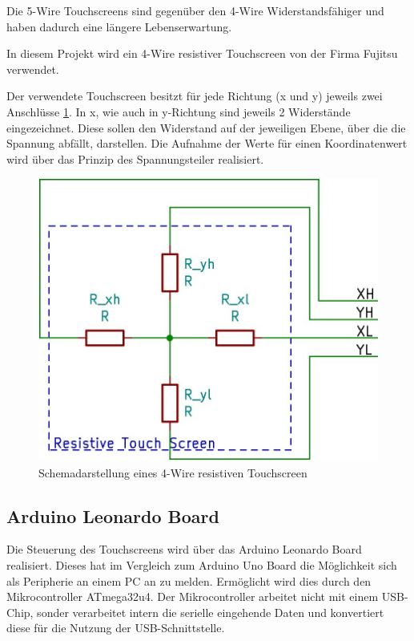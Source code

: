 Die 5-Wire Touchscreens sind gegenüber den 4-Wire Widerstandsfähiger und haben dadurch eine längere Lebenserwartung.\cite{5w4w}

In diesem Projekt wird ein 4-Wire resistiver Touchscreen von der Firma Fujitsu verwendet.

Der verwendete Touchscreen besitzt für jede Richtung (x und y) jeweils zwei Anschlüsse \cref{fig:4w}.
In x, wie auch in y-Richtung sind jeweils 2 Widerstände eingezeichnet.
Diese sollen den Widerstand auf der jeweiligen Ebene, über die die Spannung abfällt, darstellen.
Die Aufnahme der Werte für einen Koordinatenwert wird über das Prinzip des Spannungsteiler realisiert.
\begin{figure}
    \centering
    \includegraphics[width=0.6\linewidth]{fig/raster/4-wire.jpg}
    \caption{Schemadarstellung eines 4-Wire resistiven Touchscreen}\label{fig:4w}
\end{figure}
\subsection{Arduino Leonardo Board}
Die Steuerung des Touchscreens wird über das Arduino Leonardo Board realisiert. 
Dieses hat im Vergleich zum Arduino Uno Board die Möglichkeit sich als Peripherie an einem PC an zu melden.
Ermöglicht wird dies durch den Mikrocontroller ATmega32u4.
Der Mikrocontroller arbeitet nicht mit einem USB-Chip, sonder verarbeitet intern die serielle eingehende Daten und konvertiert diese für die Nutzung der USB-Schnittstelle.

